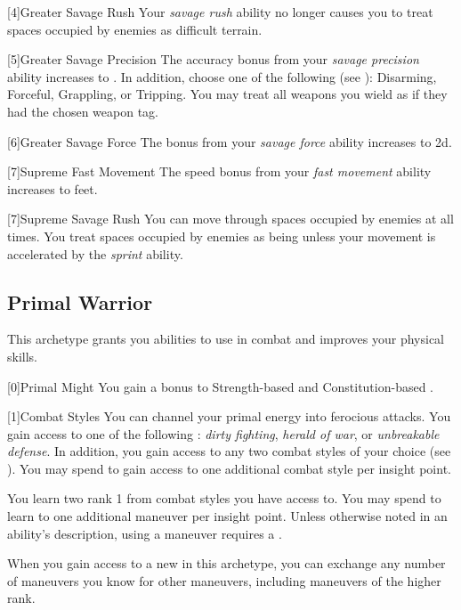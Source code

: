         [4]{Greater Savage Rush} Your \textit{savage rush} ability no longer causes you to treat spaces occupied by enemies as difficult terrain.

        [5]{Greater Savage Precision} The accuracy bonus from your \textit{savage precision} ability increases to .
        In addition, choose one of the following  (see ): Disarming, Forceful, Grappling, or Tripping.
        You may treat all weapons you wield as if they had the chosen weapon tag.

        [6]{Greater Savage Force} The bonus from your \textit{savage force} ability increases to \plus2d.

        [7]{Supreme Fast Movement} The speed bonus from your \textit{fast movement} ability increases to  feet.

        [7]{Supreme Savage Rush} You can move through spaces occupied by enemies at all times.
        You treat spaces occupied by enemies as being  unless your movement is accelerated by the \textit{sprint} ability.

    \newpage
    \subsection{Primal Warrior}
        This archetype grants you abilities to use in combat and improves your physical skills.

        [0]{Primal Might} You gain a  bonus to Strength-based  and Constitution-based .

        {
            [1]{Combat Styles}
            You can channel your primal energy into ferocious attacks.
            You gain access to one of the following : \textit{dirty fighting}, \textit{herald of war}, or \textit{unbreakable defense}.
            In addition, you gain access to any two combat styles of your choice (see ).
            You may spend  to gain access to one additional combat style per insight point.

            You learn two rank 1  from combat styles you have access to.
            You may spend  to learn to one additional maneuver per insight point.
            Unless otherwise noted in an ability's description, using a maneuver requires a .

            When you gain access to a new  in this archetype,
                you can exchange any number of maneuvers you know for other maneuvers,
                including maneuvers of the higher rank.
        }

